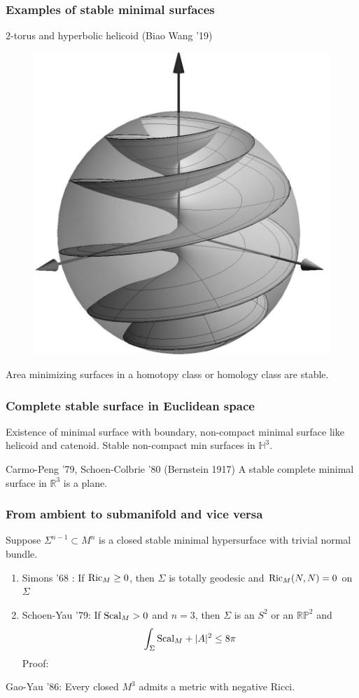 \documentclass[t]{beamer}
\newcommand{\R}{\mathbb{R}}
\newcommand{\Hy}{\mathbb{H}^3}
\newcommand{\ds}{\displaystyle}
\newcommand{\sn}{\Sigma^{n-1}}
\newcommand{\Ric}{\textnormal{Ric}}
\newcommand{\Scal}{\textnormal{Scal}}
\begin{document}
\begin{frame}
	\frametitle{Examples of stable minimal surfaces}
	$2$-torus and hyperbolic helicoid (Biao Wang '19)
	\begin{figure}
		\includegraphics[scale=0.5, right]{HyperbolicHelicoid}
	\end{figure}

\vspace{0.8in}
Area minimizing surfaces in a homotopy class or homology class are stable. 
\end{frame}

\begin{frame}
	\frametitle{Complete stable surface in Euclidean space}
Existence of minimal surface with boundary, non-compact minimal surface like helicoid and catenoid. Stable non-compact min surfaces in $\Hy$. \par 
\begin{block}{Carmo-Peng '79, Schoen-Colbrie '80 (Bernstein 1917)}
A stable complete minimal surface in $\R^3$ is a plane. 
\end{block}

\end{frame}

\begin{frame}
	\frametitle{From ambient to submanifold and vice versa}
Suppose $\sn \subset M^n$ is a closed stable minimal hypersurface with trivial normal bundle. 
\begin{enumerate}
	\item Simons '68 : If $\Ric_M \geq 0$, then $\Sigma$ is totally geodesic and $\Ric_M(N,N)=0$ on $\Sigma$
	\item Schoen-Yau '79: If $\Scal_M >0$ and $n=3$, then $\Sigma$ is an $S^2$ or an $\R \mathbb{P}^2$ and 
	\begin{equation}
		\ds \int_{\Sigma} \Scal_M +|A|^2 \leq 8 \pi
	\end{equation}
Proof: 
\end{enumerate}
\vspace{1.2in}
Gao-Yau '86: Every closed $M^3$ admits a metric with negative Ricci. 
\end{frame}
\end{document}
